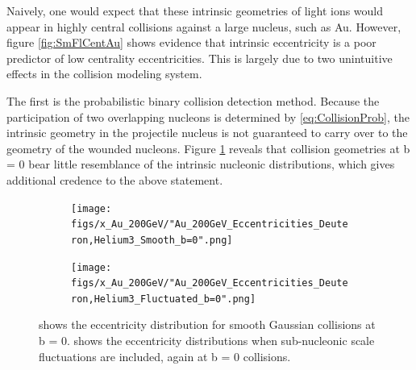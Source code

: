 \documentclass[preprint,showpacs,amsfonts,aps,prl,nofootinbib,floatfix]{revtex4}
\begin{document}
Naively, one would expect that these intrinsic geometries of light ions would appear in highly central collisions against a large nucleus, such as Au. However, figure \ref{fig:SmFlCentAu} shows evidence that intrinsic eccentricity is a poor predictor of low centrality eccentricities. This is largely due to two unintuitive effects in the collision modeling system. 

The first is the probabilistic binary collision detection method. Because the participation of two overlapping nucleons is determined by \ref{eq:CollisionProb}, the intrinsic geometry in the projectile nucleus is not guaranteed to carry over to the geometry of the wounded nucleons. Figure \ref{fig:SmFlAub=0} reveals that collision geometries at b = 0 bear little resemblance of the intrinsic nucleonic distributions, which gives additional credence to the above statement.

\begin{figure}
	\begin{center}
		\begin{subfigure}[t]{0.4\linewidth}
			\texttt{[image: figs/x\_Au\_200GeV/"Au\_200GeV\_Eccentricities\_Deuteron,Helium3\_Smooth\_b=0".png]}
			\subcaption{\label{subfig:SmAub=0}}
		\end{subfigure}
		\begin{subfigure}[t]{0.4\linewidth}
			\texttt{[image: figs/x\_Au\_200GeV/"Au\_200GeV\_Eccentricities\_Deuteron,Helium3\_Fluctuated\_b=0".png]}
			\subcaption{\label{subfig:FlAub=0}}
		\end{subfigure}
		\caption{ shows the eccentricity distribution for smooth Gaussian collisions at b = 0.  shows the eccentricity distributions when sub-nucleonic scale fluctuations are included, again at b = 0 collisions. }
		\label{fig:SmFlAub=0}
	\end{center}
\end{figure} 
\end{document}
